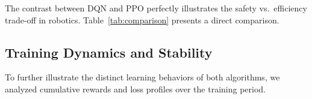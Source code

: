 \documentclass{article}
\begin{document}
The contrast between DQN and PPO perfectly illustrates the safety vs.\ efficiency
trade-off in robotics. Table~\ref{tab:comparison} presents a direct comparison.

\begin{table}[t]
\centering
{}
\caption{Best Agent Comparison: DQN vs.\ PPO}
\label{tab:comparison}
\end{table}

\subsection{Training Dynamics and Stability}

To further illustrate the distinct learning behaviors of both algorithms, we
analyzed cumulative rewards and loss profiles over the training period.
\end{document}
